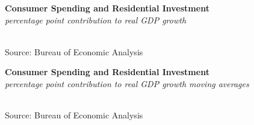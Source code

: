\documentclass{report}
\makeatletter
\newcommand{\tbllink}[1]{\href{https://raw.githubusercontent.com/bdecon/US-chartbook/master/chartbook/data/#1}{\faTable}}
\newcommand*\short[1]{\expandafter\@gobbletwo\number\numexpr#1\relax}
\newcommand{\sbar}[4]{
		\addplot[ybar stacked, bar width=2.4pt, draw opacity=0, fill=#1] 
			table [x=#2, y=#3, col sep=comma]{#4};}
\newcommand{\stdnode}[3]{\node[below, align=left, shift=({#1,#2})]{#3};}
\newcommand{\dateaxisticks}{
		date coordinates in=x, axis line style={draw=none},
		xmax={2022-01-30},
		max space between ticks=40,	    
		xtick={{1990-01-01}, {1992-01-01}, {1994-01-01}, 
			{1996-01-01}, {1998-01-01}, {2000-01-01}, 
			{2002-01-01}, {2004-01-01}, {2006-01-01},
			{2008-01-01}, {2010-01-01}, {2012-01-01}, {2014-01-01},
		    {2016-01-01}, {2018-01-01}, {2020-01-01}, {2022-01-01}},
		minor xtick={{1989-01-01}, {1991-01-01}, {1993-01-01},
			{1995-01-01}, {1997-01-01}, {1999-01-01}, 
			{2001-01-01}, {2003-01-01}, {2005-01-01}, {2007-01-01},
		    {2009-01-01}, {2011-01-01}, {2013-01-01}, {2015-01-01},
		    {2017-01-01}, {2019-01-01}, {2021-01-01}},
		enlarge y limits={0.06}, enlarge x limits={0.01},
		}
\newcommand{\bbar}[2]{extra #1 ticks = {{#2}}, extra #1 tick labels = ,
		extra #1 tick style = {grid=major, grid style={thick, black!25}},}
\newcommand{\rbars}{
		\fill[color=black!10] (axis cs:{1990-07-01},\pgfkeysvalueof{/pgfplots/ymin}) rectangle 
			(axis cs:{1991-03-01}, \pgfkeysvalueof{/pgfplots/ymax});
		\fill[color=black!10] (axis cs:{2007-12-01},\pgfkeysvalueof{/pgfplots/ymin}) rectangle 
			(axis cs:{2009-07-01}, \pgfkeysvalueof{/pgfplots/ymax});
		\fill[color=black!10] (axis cs:{2001-03-01},\pgfkeysvalueof{/pgfplots/ymin}) rectangle 
			(axis cs:{2001-11-01}, \pgfkeysvalueof{/pgfplots/ymax});
		\fill[color=black!10] (axis cs:{2020-02-01},\pgfkeysvalueof{/pgfplots/ymin}) rectangle 
			(axis cs:{2020-05-01}, \pgfkeysvalueof{/pgfplots/ymax});}
\makeatother
\begin{document}
{\begin{minipage}{0.76\textwidth}
\normalsize \textbf{Consumer Spending and Residential Investment}\\
\footnotesize{\textit{percentage point contribution to real GDP growth}}\\
\hspace*{-2mm} \\
\footnotesize{Source: Bureau of Economic Analysis} \hfill \tbllink{pce.csv}
\vspace{3mm}

\small  
\end{minipage}
\vspace{1mm}

\begin{minipage}{0.80\textwidth}
\normalsize \textbf{Consumer Spending and Residential Investment}\\
\footnotesize{\textit{percentage point contribution to real GDP growth \hspace{36mm} moving averages}}\\
 \setlength{\tabcolsep}{3.0pt} \color{black!90}
	{\renewcommand{\arraystretch}{1.55}
\hspace*{-2mm} \begin{tabular}{p{2.0mm} p{39mm} R{8.2mm} R{8.2mm} R{8.2mm} R{8.2mm} R{8.2mm} 
					R{7.8mm} R{7.2mm} R{7.2mm}}
		 \hline
	\end{tabular}}
	\vspace{-2mm}
	
\footnotesize{Source: Bureau of Economic Analysis}
\end{minipage}
\newpage 
\begin{minipage}{0.76\textwidth}
\small 
\vspace{1mm}


\end{minipage}}
\end{document}
